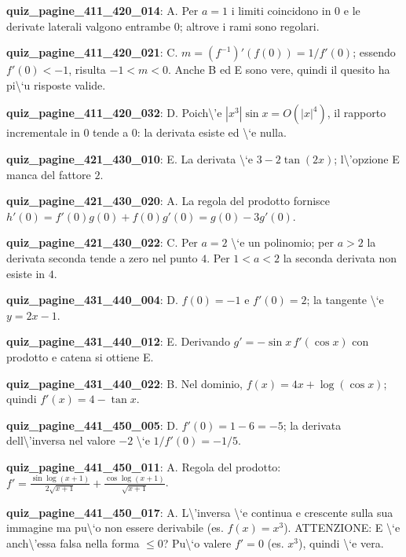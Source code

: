 \documentclass[11pt,a4paper]{article}
\newcounter{quiz}
\begin{document}
\noindent\textbf{quiz\_pagine\_411\_420\_014}: A. Per $a=1$ i limiti coincidono in $0$ e le derivate laterali valgono entrambe $0$; altrove i rami sono regolari.\par\medskip
\noindent\textbf{quiz\_pagine\_411\_420\_021}: C. $m=(f^{-1})\prime(f(0))=1/f\prime(0)$; essendo $f\prime(0)<-1$, risulta $-1<m<0$. Anche B ed E sono vere, quindi il quesito ha pi\textbackslash{}`u risposte valide.\par\medskip
\noindent\textbf{quiz\_pagine\_411\_420\_032}: D. Poich\textbackslash{}'e $|x^3|\sin x=O(|x|^4)$, il rapporto incrementale in $0$ tende a $0$: la derivata esiste ed \textbackslash{}`e nulla.\par\medskip
\noindent\textbf{quiz\_pagine\_421\_430\_010}: E. La derivata \textbackslash{}`e $3-2\tan(2x)$; l\textbackslash{}'opzione E manca del fattore $2$.\par\medskip
\noindent\textbf{quiz\_pagine\_421\_430\_020}: A. La regola del prodotto fornisce $h\prime(0)=f\prime(0)g(0)+f(0)g\prime(0)=g(0)-3g\prime(0)$.\par\medskip
\noindent\textbf{quiz\_pagine\_421\_430\_022}: C. Per $a=2$ \textbackslash{}`e un polinomio; per $a>2$ la derivata seconda tende a zero nel punto $4$. Per $1<a<2$ la seconda derivata non esiste in $4$.\par\medskip
\noindent\textbf{quiz\_pagine\_431\_440\_004}: D. $f(0)=-1$ e $f\prime(0)=2$; la tangente \textbackslash{}`e $y=2x-1$.\par\medskip
\noindent\textbf{quiz\_pagine\_431\_440\_012}: E. Derivando $g\prime=-\sin x\,f\prime(\cos x)$ con prodotto e catena si ottiene E.\par\medskip
\noindent\textbf{quiz\_pagine\_431\_440\_022}: B. Nel dominio, $f(x)=4x+\log(\cos x)$; quindi $f\prime(x)=4-\tan x$.\par\medskip
\noindent\textbf{quiz\_pagine\_441\_450\_005}: D. $f\prime(0)=1-6=-5$; la derivata dell\textbackslash{}'inversa nel valore $-2$ \textbackslash{}`e $1/f\prime(0)=-1/5$.\par\medskip
\noindent\textbf{quiz\_pagine\_441\_450\_011}: A. Regola del prodotto: $f\prime=\frac{\sin\log(x+1)}{2\sqrt{x+1}}+\frac{\cos\log(x+1)}{\sqrt{x+1}}$.\par\medskip
\noindent\textbf{quiz\_pagine\_441\_450\_017}: A. L\textbackslash{}'inversa \textbackslash{}`e continua e crescente sulla sua immagine ma pu\textbackslash{}`o non essere derivabile (es. $f(x)=x^3$). ATTENZIONE: E \textbackslash{}`e anch\textbackslash{}'essa falsa nella forma $\le0$? Pu\textbackslash{}`o valere $f\prime=0$ (es. $x^3$), quindi \textbackslash{}`e vera.\par\medskip
\end{document}
